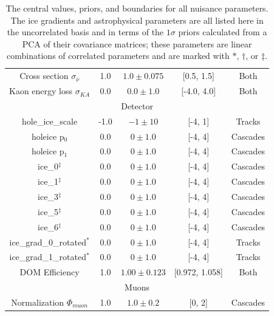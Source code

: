 \documentclass[main.tex]{subfiles}
\begin{document}
\begin{table}
\begin{tabular}{c | cccc}
        Cross section $\sigma_{\bar{\nu}}$ & 1.0 & $1.0\pm0.075$ & [0.5, 1.5]& Both  \\
        Kaon energy loss $\sigma_{KA}$ & 0.0 & $0.0\pm1.0$ & [-4.0, 4.0]& Both  \\
        \multicolumn{5}{c}{Detector} \\\hline 
        hole\_ice\_scale & -1.0 & $-1\pm10$ & [-4, 1]&Tracks  \\
        holeice p$_{0}$ & 0.0 & $0\pm 1.0$ & [-4, 4]&Cascades \\
        holeice p$_{1}$ & 0.0 & $0\pm 1.0$ & [-4, 4]&Cascades  \\
        ice\_0$^{\ddag}$ & 0.0 & $0\pm 1.0$ & [-4, 4]&Cascades  \\
        ice\_1$^{\ddag}$ & 0.0 & $0\pm 1.0$ & [-4, 4]&Cascades \\
        ice\_3$^{\ddag}$ & 0.0 & $0\pm 1.0$ & [-4, 4]&Cascades \\
        ice\_5$^{\ddag}$ & 0.0 & $0\pm 1.0$ & [-4, 4]&Cascades \\
        ice\_6$^{\ddag}$ & 0.0 & $0\pm 1.0$ & [-4, 4]&Cascades \\
        ice\_grad\_0\_rotated$^{*}$ & 0.0 & $0\pm 1.0$ & [-4, 4] & Tracks  \\
        ice\_grad\_1\_rotated$^{*}$ & 0.0 & $0\pm 1.0$ & [-4, 4]& Tracks  \\
        DOM Efficiency & 1.0 & $1.00\pm0.123$ & [0.972, 1.058] & Both \\
        \multicolumn{5}{c}{Muons} \\\hline
        Normalization $\Phi_{muon}$ & 1.0 & $1.0\pm0.2$ & [0, 2] & Cascades  \\        
    \end{tabular}
    \caption{The central values, priors, and boundaries for all nuisance parameters. The ice gradients and astrophysical parameters are all listed here in the uncorrelated basis and in terms of the $1\sigma$ priors calculated from a PCA of their covariance matrices; these parameters are linear combinations of correlated parameters and are marked with $*$, $\dag$, or $\ddag$.}\label{table:nutrition}
\end{table}
\end{document}
